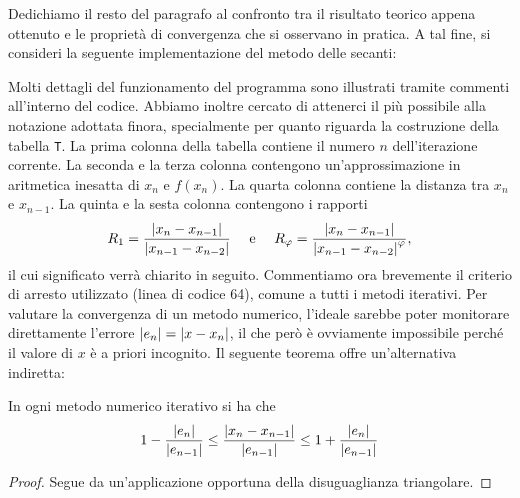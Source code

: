 Dedichiamo il resto del paragrafo al confronto tra il risultato teorico
appena ottenuto e le proprietà di convergenza che si osservano in pratica.
A tal fine, si consideri la seguente implementazione del metodo delle secanti:
\vspace{1.5ex}

\vspace{1ex}
Molti dettagli del funzionamento del programma sono illustrati tramite
commenti all'interno del codice.
Abbiamo inoltre cercato di attenerci il più possibile alla notazione adottata
finora, specialmente per quanto riguarda la costruzione della tabella
\texttt{T}.
La prima colonna della tabella contiene il numero $n$ dell'iterazione corrente.
La seconda e la terza colonna contengono un'approssimazione in aritmetica inesatta
di $x_n$ e $f(x_n)$.
La quarta colonna contiene la distanza tra $x_n$ e $x_{n-1}$.
La quinta e la sesta colonna contengono i rapporti
\[
R_1 = \frac{\left\lvert x_n-x_{n-1}\right\rvert}{\left\lvert x_{n-1}-x_{n-2}\right\rvert}
\quad \text{ e } \quad
R_\varphi = \frac{\left\lvert x_n-x_{n-1}\right\rvert}{\left\lvert x_{n-1}-x_{n-2}\right\rvert^\varphi},
\]
il cui significato verrà chiarito in seguito.
Commentiamo ora brevemente il criterio di arresto utilizzato
(linea di codice 64), comune a tutti i metodi iterativi.
Per valutare la convergenza di un metodo numerico, l'ideale sarebbe
poter monitorare direttamente l'errore $\left\lvert e_n\right\rvert = \left\lvert x-x_n\right\rvert$,
il che però è ovviamente impossibile perché il valore di $x$ è a priori incognito.
Il seguente teorema offre un'alternativa indiretta:

\begin{teor} \label{teor:indicatore-convergenza}
In ogni metodo numerico iterativo si ha che
\[
1 - \frac{\left\lvert e_n\right\rvert}{\left\lvert e_{n-1}\right\rvert}
\leq \frac{\left\lvert x_n-x_{n-1}\right\rvert}{\left\lvert e_{n-1}\right\rvert}
\leq 1 + \frac{\left\lvert e_n\right\rvert}{\left\lvert e_{n-1}\right\rvert}
\]
\end{teor}

\begin{proof}
Segue da un'applicazione opportuna della disuguaglianza triangolare.
\end{proof}

